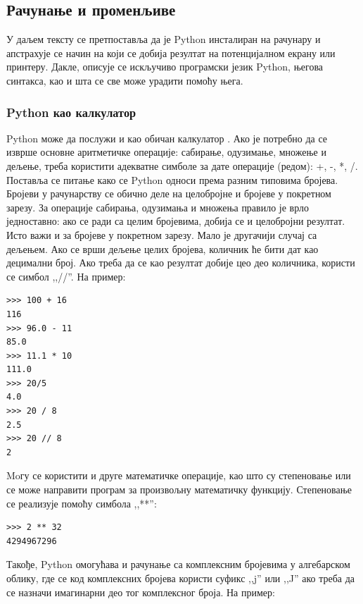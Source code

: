 \subsection{Рачунање и променљиве}

У даљем тексту се претпоставља да је Python инсталиран на рачунару и апстрахује се начин на који се добија резултат на потенцијалном екрану или принтеру. Дакле, описује се искључиво програмски језик Python, његова синтакса, као и шта се све може урадити помоћу њега.

\subsubsection{Python као калкулатор}

Python може да послужи и као обичан калкулатор \cite{van2003introduction,lutz2009learning}. Ако је потребно да се изврше основне аритметичке операције: сабирање, одузимање, множење и дељење, треба користити адекватне симболе за дате операције (редом): +, -, *, /. Поставља се питање како се Python односи према разним типовима бројева. Бројеви у рачунарству се обично деле на целобројне и бројеве у покретном зарезу. За операције сабирања, одузимања и множења правило је врло једноставно: ако се ради са целим бројевима, добија се и целобројни резултат. Исто важи и за бројеве у покретном зарезу. Мало је другачији случај са дељењем. Ако се врши дељење целих бројева, количник ће бити дат као децимални број. Ако треба да се као резултат добије цео део количника, користи се симбол ,,//''. На пример:

\begin{lstlisting}[caption = Примери операција са бројевима, label = racun]
>>> 100 + 16
116
>>> 96.0 - 11
85.0
>>> 11.1 * 10
111.0
>>> 20/5
4.0
>>> 20 / 8
2.5
>>> 20 // 8
2
\end{lstlisting}

Moгу се користити и друге математичке операције, као што су степеновање или се може направити програм за произвољну математичку функцију. Степеновање се реализује помоћу симбола ,,**'':

\begin{lstlisting}[caption = Степеновање, label = stepen]
>>> 2 ** 32
4294967296
\end{lstlisting}

Такође, Python омогућава и рачунање са комплексним бројевима у алгебарском облику, где се код комплексних бројева користи суфикс ,,j'' или ,,J'' ако треба да се назначи имагинарни део тог комплексног броја. На пример:

